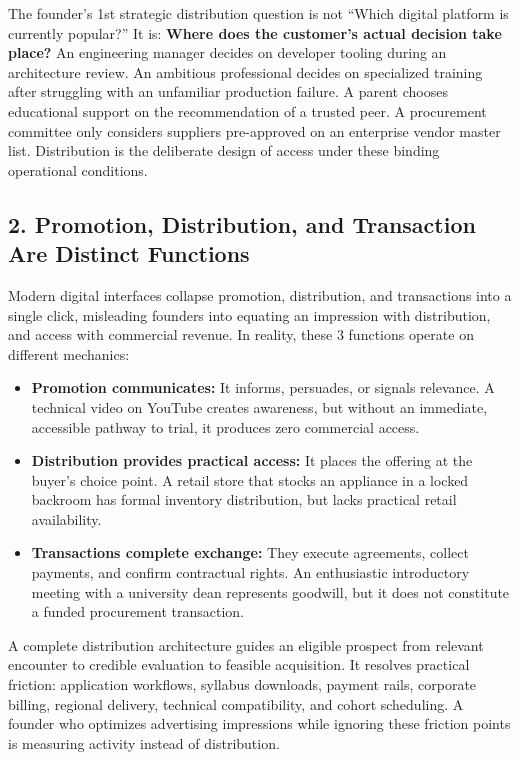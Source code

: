 The founder's 1st strategic distribution question is not ``Which digital platform is currently popular?'' It is: \textbf{Where does the customer's actual decision take place?} An engineering manager decides on developer tooling during an architecture review. An ambitious professional decides on specialized training after struggling with an unfamiliar production failure. A parent chooses educational support on the recommendation of a trusted peer. A procurement committee only considers suppliers pre-approved on an enterprise vendor master list. Distribution is the deliberate design of access under these binding operational conditions.

\subsection*{2. Promotion, Distribution, and Transaction Are Distinct Functions}

Modern digital interfaces collapse promotion, distribution, and transactions into a single click, misleading founders into equating an impression with distribution, and access with commercial revenue. In reality, these 3 functions operate on different mechanics:
\begin{itemize}[leftmargin=*,itemsep=1pt]
  \item \textbf{Promotion communicates:} It informs, persuades, or signals relevance. A technical video on YouTube creates awareness, but without an immediate, accessible pathway to trial, it produces zero commercial access.
  \item \textbf{Distribution provides practical access:} It places the offering at the buyer's choice point. A retail store that stocks an appliance in a locked backroom has formal inventory distribution, but lacks practical retail availability.
  \item \textbf{Transactions complete exchange:} They execute agreements, collect payments, and confirm contractual rights. An enthusiastic introductory meeting with a university dean represents goodwill, but it does not constitute a funded procurement transaction.
\end{itemize}

A complete distribution architecture guides an eligible prospect from relevant encounter to credible evaluation to feasible acquisition. It resolves practical friction: application workflows, syllabus downloads, payment rails, corporate billing, regional delivery, technical compatibility, and cohort scheduling. A founder who optimizes advertising impressions while ignoring these friction points is measuring activity instead of distribution.


